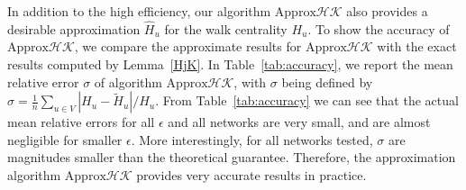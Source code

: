 \documentclass[sigconf]{acmart}
\def\eps{\epsilon}
\begin{document}


In addition to the high efficiency,  our algorithm  $\text{Approx}\mathcal{HK}$ also provides a desirable approximation $\hat{H}_u$ for the walk centrality $H_u$.   To show the accuracy of   $\text{Approx}\mathcal{HK}$, we compare the  approximate  results for $\text{Approx}\mathcal{HK}$ with the exact results computed by  Lemma~\ref{HjK}. In Table~\ref{tab:accuracy}, we report the mean relative error $\sigma$ of algorithm  $\text{Approx}\mathcal{HK}$, with $\sigma$ being defined by $\sigma=\frac{1}{n}\sum_{u\in V}|{H_u}-\tilde{H}_u|/{H_u}$. From  Table~\ref{tab:accuracy} we can see that  the actual mean relative errors for all $\epsilon$ and all networks are  very small, and are almost negligible for smaller $\epsilon$. More interestingly, for all networks tested,   $\sigma$ are magnitudes smaller than the theoretical guarantee. Therefore, the  approximation algorithm  $\text{Approx}\mathcal{HK}$ provides very accurate results in practice.
\end{document}
